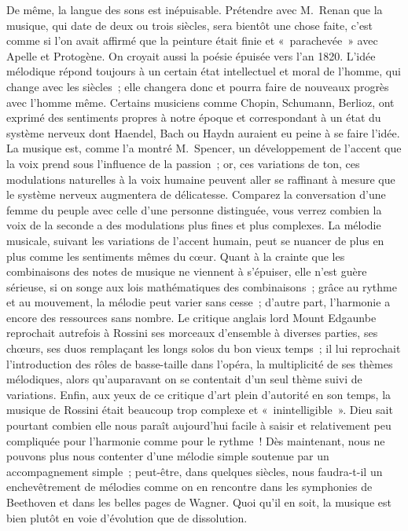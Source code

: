 \documentclass[french,twoside]{book} %
\begin{document}
De même, la langue des sons est inépuisable. Prétendre avec M. Renan que la musique, qui date de deux ou trois siècles, sera bientôt une chose faite, c’est comme si l’on avait affirmé que la peinture était finie et « parachevée » avec Apelle et Protogène. On croyait aussi la poésie épuisée vers l’an 1820. L’idée mélodique répond toujours à un certain état intellectuel et moral de l’homme, qui change avec les siècles ; elle changera donc et pourra faire de nouveaux progrès avec l’homme même. Certains  musiciens comme Chopin, Schumann, Berlioz, ont exprimé des sentiments propres à notre époque et correspondant à un état du système nerveux dont Haendel, Bach ou Haydn auraient eu peine à se faire l’idée. La musique est, comme l’a montré M. Spencer, un développement de l’accent que la voix prend sous l’influence de la passion ; or, ces variations de ton, ces modulations naturelles à la voix humaine peuvent aller se raffinant à mesure que le système nerveux augmentera de délicatesse. Comparez la conversation d’une femme du peuple avec celle d’une personne distinguée, vous verrez combien la voix de la seconde a des modulations plus fines et plus complexes. La mélodie musicale, suivant les variations de l’accent humain, peut se nuancer de plus en plus comme les sentiments mêmes du cœur. Quant à la crainte que les combinaisons des notes de musique ne viennent à s’épuiser, elle n’est guère sérieuse, si on songe aux lois mathématiques des combinaisons ; grâce au rythme et au mouvement, la mélodie peut varier sans cesse ; d’autre part, l’harmonie a encore des ressources sans nombre. Le critique anglais lord Mount Edgaunbe reprochait autrefois à Rossini ses morceaux d’ensemble à diverses parties, ses chœurs, ses duos remplaçant les longs solos du bon vieux temps ; il lui reprochait l’introduction des rôles de basse-taille dans l’opéra, la multiplicité de ses thèmes mélodiques, alors qu’auparavant on se contentait d’un seul thème suivi de variations. Enfin, aux yeux de ce critique d’art plein d’autorité en son temps, la musique de Rossini était beaucoup trop complexe et « inintelligible ». Dieu sait pourtant combien elle  nous paraît aujourd’hui facile à saisir et relativement peu compliquée pour l’harmonie comme pour le rythme ! Dès maintenant, nous ne pouvons plus nous contenter d’une mélodie simple soutenue par un accompagnement simple ; peut-être, dans quelques siècles, nous faudra-t-il un enchevêtrement de mélodies comme on en rencontre dans les symphonies de Beethoven et dans les belles pages de Wagner. Quoi qu’il en soit, la musique est bien plutôt en voie d’évolution que de dissolution.\par
\end{document}
